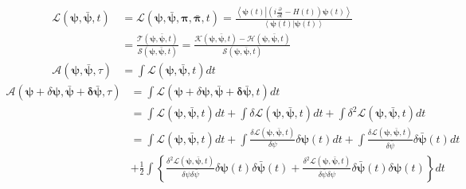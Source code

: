 \documentclass[aps,preprint]{revtex4}%
\begin{document}
\begin{align}
\mathcal{L}\left(  \mathbf{\psi},\mathbf{\bar{\psi},}t\right)   &
=\mathcal{L}\left(  \mathbf{\psi},\mathbf{\bar{\psi},\pi},\mathbf{\bar{\pi}%
,}t\right)  =\frac{\left\langle \mathbf{\psi}\left(  t\right)  \left\vert
\left(  i\frac{\partial}{\partial t}-H\left(  t\right)  \right)  \mathbf{\psi
}\left(  t\right)  \right.  \right\rangle }{\left\langle \mathbf{\psi}\left(
t\right)  \left\vert \mathbf{\psi}\left(  t\right)  \right.  \right\rangle }\\
&  =\frac{\mathcal{T}\left(  \mathbf{\psi},\mathbf{\bar{\psi},}t\right)
}{\mathcal{S}\left(  \mathbf{\psi},\mathbf{\bar{\psi},}t\right)  }%
=\frac{\mathcal{K}\left(  \mathbf{\psi},\mathbf{\bar{\psi},}t\right)
-\mathcal{H}\left(  \mathbf{\psi},\mathbf{\bar{\psi},}t\right)  }%
{\mathcal{S}\left(  \mathbf{\psi},\mathbf{\bar{\psi},}t\right)  }\\
\mathcal{A}\left(  \mathbf{\psi},\mathbf{\bar{\psi},}\tau\right)   &
=\int\mathcal{L}\left(  \mathbf{\psi},\mathbf{\bar{\psi},}t\right)  dt
\end{align}%
\begin{align}
\mathcal{A}\left(  \mathbf{\psi+}\delta\mathbf{\psi},\mathbf{\bar{\psi}%
+\delta\bar{\psi},}\tau\right)   &  =\int\mathcal{L}\left(  \mathbf{\psi
+}\delta\mathbf{\psi},\mathbf{\bar{\psi}+\delta\bar{\psi},}t\right)
dt\nonumber\\
&  =\int\mathcal{L}\left(  \mathbf{\psi},\mathbf{\bar{\psi},}t\right)
dt+\int\delta\mathcal{L}\left(  \mathbf{\psi},\mathbf{\bar{\psi},}t\right)
dt+\int\delta^{2}\mathcal{L}\left(  \mathbf{\psi},\mathbf{\bar{\psi}%
,}t\right)  dt\nonumber\\
&  =\int\mathcal{L}\left(  \mathbf{\psi},\mathbf{\bar{\psi},}t\right)
dt+\int\frac{\delta\mathcal{L}\left(  \mathbf{\psi},\mathbf{\bar{\psi}%
,}t\right)  }{\delta\psi}\delta\mathbf{\psi}\left(  t\right)  dt+\int
\frac{\delta\mathcal{L}\left(  \mathbf{\psi},\mathbf{\bar{\psi},}t\right)
}{\delta\bar{\psi}}\delta\mathbf{\bar{\psi}}\left(  t\right)  dt\nonumber\\
&  +\frac{1}{2}\int\left\{  \frac{\delta^{2}\mathcal{L}\left(  \mathbf{\psi
},\mathbf{\bar{\psi},}t\right)  }{\delta\psi\delta\bar{\psi}}\delta
\mathbf{\psi}\left(  t\right)  \delta\mathbf{\bar{\psi}}\left(  t\right)
+\frac{\delta^{2}\mathcal{L}\left(  \mathbf{\psi},\mathbf{\bar{\psi}%
,}t\right)  }{\delta\bar{\psi}\delta\psi}\delta\mathbf{\bar{\psi}}\left(
t\right)  \delta\mathbf{\psi}\left(  t\right)  \right\}  dt\label{expan}%
\end{align}
\end{document}
